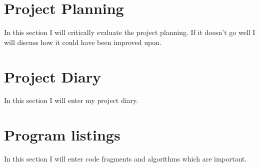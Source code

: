 \appendix

\section{Project Planning}
\label{Appendix: Project Planning}
In this section I will critically evaluate the project planning. If it doesn't go well I will discuss how it could have been improved upon.
\newpage

\section{Project Diary}
\label{Appendix: Project Diary}
In this section I will enter my project diary.
\newpage

\section{Program listings}
\label{Appendix: Program listings}
In this section I will enter code fragments and algorithms which are important. 
\newpage

\cite{1} %